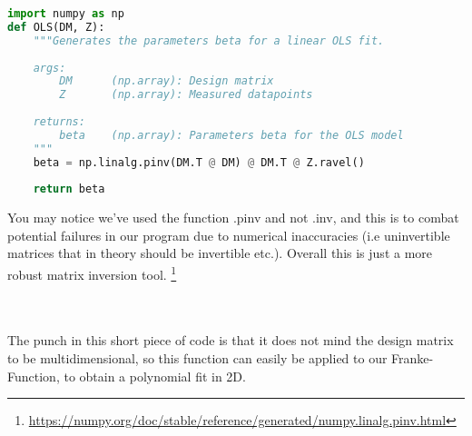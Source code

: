 \documentclass[../main.tex]{subfiles}
\begin{document}
\begin{lstlisting}[language=Python]
import numpy as np
def OLS(DM, Z):
    """Generates the parameters beta for a linear OLS fit.
    
    args:
        DM      (np.array): Design matrix
        Z       (np.array): Measured datapoints
    
    returns:
        beta    (np.array): Parameters beta for the OLS model
    """
    beta = np.linalg.pinv(DM.T @ DM) @ DM.T @ Z.ravel()
    
    return beta

\end{lstlisting}
\vskip0.1in
\indent You may notice we've used the function .pinv and not .inv, and this is to combat potential failures in our program due to numerical inaccuracies (i.e uninvertible matrices that in theory should be invertible etc.). Overall this is just a more robust matrix inversion tool. \footnote{\url{https://numpy.org/doc/stable/reference/generated/numpy.linalg.pinv.html}}

\\ \\ The punch in this short piece of code is that it does not mind the design matrix to be multidimensional, so this function can easily be applied to our Franke-Function, to obtain a polynomial fit in 2D.
\newpage
\end{document}
